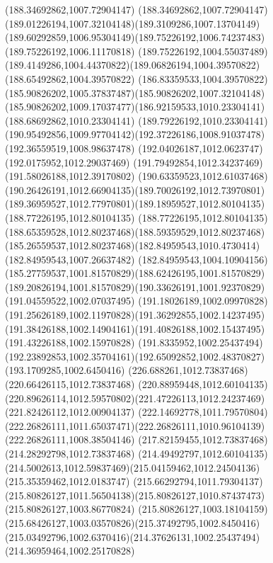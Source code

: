 {{		\lineto(188.34692862,1007.72904147)
		\curveto(188.34692862,1007.72904147)(189.01226194,1007.32104148)(189.3109286,1007.13704149)
		\curveto(189.60292859,1006.95304149)(189.75226192,1006.74237483)(189.75226192,1006.11170818)
		\lineto(189.75226192,1004.55037489)
		\curveto(189.4149286,1004.44370822)(189.06826194,1004.39570822)(188.65492862,1004.39570822)
		\curveto(186.83359533,1004.39570822)(185.90826202,1005.37837487)(185.90826202,1007.32104148)
		\curveto(185.90826202,1009.17037477)(186.92159533,1010.23304141)(188.68692862,1010.23304141)
		\curveto(189.79226192,1010.23304141)(190.95492856,1009.97704142)(192.37226186,1008.91037478)
		\lineto(192.36559519,1008.98637478)
		\lineto(192.04026187,1012.0623747)
		\lineto(192.0175952,1012.29037469)
		\lineto(191.79492854,1012.34237469)
		\lineto(191.58026188,1012.39170802)
		\curveto(190.63359523,1012.61037468)(190.26426191,1012.66904135)(189.70026192,1012.73970801)
		\curveto(189.36959527,1012.77970801)(189.18959527,1012.80104135)(188.77226195,1012.80104135)
		\curveto(188.77226195,1012.80104135)(188.65359528,1012.80237468)(188.59359529,1012.80237468)
		\curveto(185.26559537,1012.80237468)(182.84959543,1010.4730414)(182.84959543,1007.26637482)
		\curveto(182.84959543,1004.10904156)(185.27759537,1001.81570829)(188.62426195,1001.81570829)
		\curveto(189.20826194,1001.81570829)(190.33626191,1001.92370829)(191.04559522,1002.07037495)
		\curveto(191.18026189,1002.09970828)(191.25626189,1002.11970828)(191.36292855,1002.14237495)
		\curveto(191.38426188,1002.14904161)(191.40826188,1002.15437495)(191.43226188,1002.15970828)
		\curveto(191.8335952,1002.25437494)(192.23892853,1002.35704161)(192.65092852,1002.48370827)
		\lineto(193.1709285,1002.6450416)
		\closepath
		\moveto(226.688261,1012.73837468)
		\lineto(220.66426115,1012.73837468)
		\lineto(220.88959448,1012.60104135)
		\curveto(220.89626114,1012.59570802)(221.47226113,1012.24237469)(221.82426112,1012.00904137)
		\curveto(222.14692778,1011.79570804)(222.26826111,1011.65037471)(222.26826111,1010.96104139)
		\lineto(222.26826111,1008.38504146)
		\lineto(217.82159455,1012.73837468)
		\lineto(214.28292798,1012.73837468)
		\lineto(214.49492797,1012.60104135)
		\curveto(214.5002613,1012.59837469)(215.04159462,1012.24504136)(215.35359462,1012.0183747)
		\curveto(215.66292794,1011.79304137)(215.80826127,1011.56504138)(215.80826127,1010.87437473)
		\lineto(215.80826127,1003.86770824)
		\curveto(215.80826127,1003.18104159)(215.68426127,1003.03570826)(215.37492795,1002.8450416)
		\curveto(215.03492796,1002.6370416)(214.37626131,1002.25437494)(214.36959464,1002.25170828)
}}
